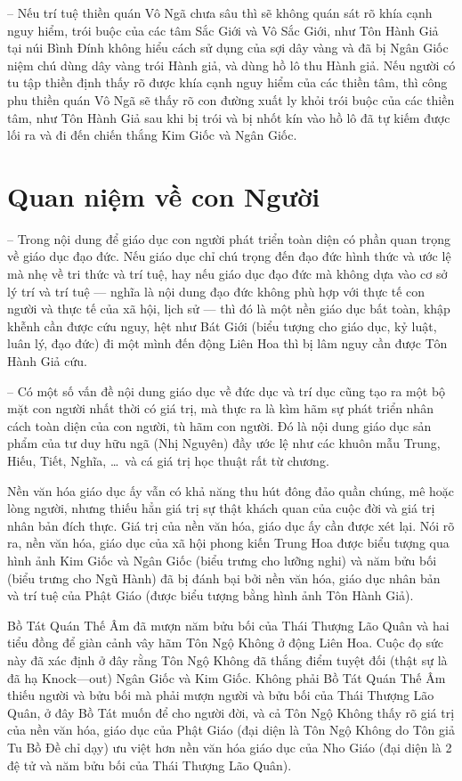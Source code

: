 -- Nếu trí tuệ thiền quán Vô Ngã chưa sâu thì sẽ không quán sát rõ khía cạnh nguy hiểm, trói buộc của các tâm Sắc Giới và Vô Sắc Giới, như Tôn Hành Giả tại núi Bình Đính không hiểu cách sử dụng của sợi dây vàng và đã bị Ngân Giốc niệm chú dùng dây vàng trói Hành giả, và dùng hồ lô thu Hành giả. Nếu người có tu tập thiền định thấy rõ được khía cạnh nguy hiểm của các thiền tâm, thì công phu thiền quán Vô Ngã sẽ thấy rõ con đường xuất ly khỏi trói buộc của các thiền tâm, như Tôn Hành Giả sau khi bị trói và bị nhốt kín vào hồ lô đã tự kiếm được lối ra và đi đến chiến thắng Kim Giốc và Ngân Giốc.

\section{Quan niệm về con Người} %
\label{sec:33_34_con_nguoi}

-- Trong nội dung để giáo dục con người phát triển toàn diện có phần quan trọng về giáo dục đạo đức. Nếu giáo dục chỉ chú trọng đến đạo đức hình thức và ước lệ mà nhẹ về tri thức và trí tuệ, hay nếu giáo dục đạo đức mà không dựa vào cơ sở lý trí và trí tuệ --- nghĩa là nội dung đạo đức không phù hợp với thực tế con người và thực tế của xã hội, lịch sử --- thì đó là một nền giáo dục bất toàn, khập khễnh cần được cứu nguy, hệt như Bát Giới (biểu tượng cho giáo dục, kỷ luật, luân lý, đạo đức) đi một mình đến động Liên Hoa thì bị lâm nguy cần được Tôn Hành Giả cứu.

-- Có một số vấn đề nội dung giáo dục về đức dục và trí dục cũng tạo ra một bộ mặt con người nhất thời có giá trị, mà thực ra là kìm hãm sự phát triển nhân cách toàn diện của con người, tù hãm con người. Đó là nội dung giáo dục sản phẩm của tư duy hữu ngã (Nhị Nguyên) đầy ước lệ như các khuôn mẫu Trung, Hiếu, Tiết, Nghĩa, \ldots ~và cá giá trị học thuật rất từ chương.

Nền văn hóa giáo dục ấy vẫn có khả năng thu hút đông đảo quần chúng, mê hoặc lòng người, nhưng thiếu hẳn giá trị sự thật khách quan của cuộc đời và giá trị nhân bản đích thực. Giá trị của nền văn hóa, giáo dục ấy cần được xét lại. Nói rõ ra, nền văn hóa, giáo dục của xã hội phong kiến Trung Hoa được biểu tượng qua hình ảnh Kim Giốc và Ngân Giốc (biểu trưng cho lưỡng nghi) và năm bửu bối (biểu trưng cho Ngũ Hành) đã bị đánh bại bởi nền văn hóa, giáo dục nhân bản và trí tuệ của Phật Giáo (được biểu tượng bằng hình ảnh Tôn Hành Giả).

Bồ Tát Quán Thế Âm đã mượn năm bửu bối của Thái Thượng Lão Quân và hai tiểu đồng để giàn cảnh vây hãm Tôn Ngộ Không ở động Liên Hoa. Cuộc đọ sức này đã xác định ở đây rằng Tôn Ngộ Không đã thắng điểm tuyệt đối (thật sự là đã hạ Knock---out) Ngân Giốc và Kim Giốc. Không phải Bồ Tát Quán Thế Âm thiếu người và bửu bối mà phải mượn người và bửu bối của Thái Thượng Lão Quân, ở đây Bồ Tát muốn để cho người đời, và cả Tôn Ngộ Không thấy rõ giá trị của nền văn hóa, giáo dục của Phật Giáo (đại diện là Tôn Ngộ Không do Tôn giả Tu Bồ Đề chỉ dạy) ưu việt hơn nền văn hóa giáo dục của Nho Giáo (đại diện là 2 đệ tử và năm bửu bối của Thái Thượng Lão Quân).

